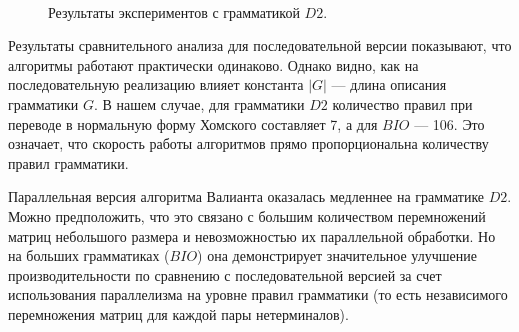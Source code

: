 \documentclass[14pt]{matmex-diploma-custom}
\begin{document}
\begin{figure}[H]
\centering
{}
~

\caption{Результаты экспериментов с грамматикой $D2$.}
\label{expPlots}
\end{figure}


Результаты сравнительного анализа для последовательной версии показывают, что алгоритмы работают практически одинаково. Однако видно, как на последовательную реализацию влияет константа $|G|$ --- длина описания грамматики $G$. В нашем случае, для грамматики $D2$ количество правил при переводе в нормальную форму Хомского составляет 7, а для $BIO$ ---  106. Это означает, что скорость работы алгоритмов прямо пропорциональна количеству правил грамматики. 

Параллельная версия алгоритма Валианта оказалась медленнее на грамматике $D2$. Можно предположить, что это связано с большим количеством перемножений матриц небольшого размера и невозможностью их параллельной обработки. Но на больших грамматиках ($BIO$) она демонстрирует значительное улучшение производительности по сравнению с последовательной версией за счет использования параллелизма на уровне правил грамматики (то есть независимого перемножения матриц для каждой пары нетерминалов).
\end{document}
